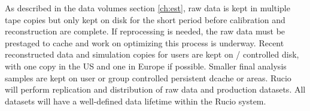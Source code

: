 \documentclass[../main-v1.tex]{subfiles}
\begin{document}
As described in the data volumes section \ref{ch:est}, raw data is kept in multiple tape copies but only kept on disk for the short period before calibration and reconstruction are complete.  If reprocessing is needed, the raw data must be prestaged to cache and work on optimizing this process is underway. Recent reconstructed data and simulation copies for users are kept on / controlled disk, with one copy in the US and one in Europe if possible. Smaller final analysis samples are kept on user or group controlled persistent dcache or  areas. Rucio will perform replication and distribution of raw data and production datasets. 
 All datasets will have a well-defined data lifetime within the Rucio system. 
\end{document}
